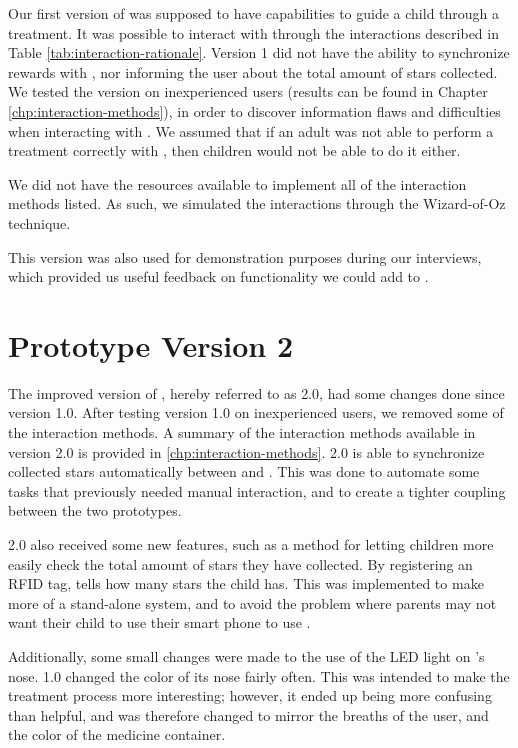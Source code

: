 Our first version of \ab{} was supposed to have capabilities to guide a child through a treatment. It was possible to interact with \ab{} through the interactions described in Table \ref{tab:interaction-rationale}. Version 1 did not have the ability to synchronize rewards with \app{}, nor informing the user about the total amount of stars collected. We tested the version on inexperienced users (results can be found in Chapter \ref{chp:interaction-methods}), in order to discover information flaws and difficulties when interacting with \ab{}. We assumed that if an adult was not able to perform a treatment correctly with \ab{}, then children would not be able to do it either.  

We did not have the resources available to implement all of the interaction methods listed. As such, we simulated the interactions through the Wizard-of-Oz technique\cite{wilson1988rapid}.

This version was also used for demonstration purposes during our interviews, which provided us useful feedback on functionality we could add to \ab{}.           
	
\section{Prototype Version 2}
\label{sec:abversion2}
The improved version of \ab{}, hereby referred to as \ab{} 2.0, had some changes done since version 1.0. After testing version 1.0 on inexperienced users, we removed some of the interaction methods. A summary of the interaction methods available in version 2.0 is provided in \ref{chp:interaction-methods}. \ab{} 2.0 is able to synchronize collected stars automatically between \app{} and \ab{}. This was done to automate some tasks that previously needed manual interaction, and to create a tighter coupling between the two prototypes.

\ab{} 2.0 also received some new features, such as a method for letting children more easily check the total amount of stars they have collected. By registering an RFID tag, \ab{} tells how many stars the child has. This was implemented to make \ab{} more of a stand-alone system, and to avoid the problem where parents may not want their child to use their smart phone to use \app{}. 
 
Additionally, some small changes were made to the use of the LED light on \ab{}'s nose. \ab{} 1.0 changed the color of its nose fairly often. This was intended to make the treatment process more interesting; however, it ended up being more confusing than helpful, and was therefore changed to mirror the breaths of the user, and the color of the medicine container. 

